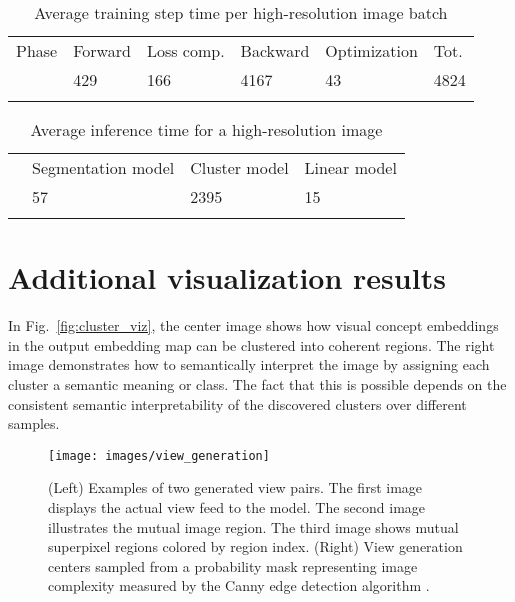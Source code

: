 \documentclass{bmvc2k}
\begin{document}
\setlength{\tabcolsep}{4pt}
\begin{table}
\begin{center}
\caption{Average training step time per high-resolution image batch}
\begin{tabular}{llllll}
\hline\noalign{\smallskip}
 Phase & Forward & Loss comp. & Backward & Optimization & Tot. \\
 \noalign{\smallskip}
 \hline
 [msec] & 429 & 166 & 4167 & 43 & 4824 \\ 
 \hline
\label{tab:training_step_timings}
\end{tabular}
\end{center}
\end{table}
\setlength{\tabcolsep}{1.4pt}

\setlength{\tabcolsep}{4pt}
\begin{table}
\begin{center}
\caption{Average inference time for a high-resolution image}
\begin{tabular}{llll}
\hline\noalign{\smallskip}
  & Segmentation model & Cluster model & Linear model \\
 \noalign{\smallskip}
 \hline
 [msec] & 57 & 2395 & 15 \\ 
 \hline
\label{tab:inference_step_timings}
\end{tabular}
\end{center}
\end{table}
\setlength{\tabcolsep}{1.4pt}

\section{Additional visualization results}

In Fig.~\ref{fig:cluster_viz}, the center image shows how visual concept embeddings in the output embedding map can be clustered into coherent regions. The right image demonstrates how to semantically interpret the image by assigning each cluster a semantic meaning or class. The fact that this is possible depends on the consistent semantic interpretability of the discovered clusters over different samples.

\begin{figure}
\begin{center}
\texttt{[image: images/view\_generation]}
\end{center}
   \caption{(Left) Examples of two generated view pairs. The first image displays the actual view feed to the model. The second image illustrates the mutual image region. The third image shows mutual superpixel regions colored by region index. (Right) View generation centers sampled from a probability mask representing image complexity measured by the Canny edge detection algorithm \cite{Canny1986CannyEdge}.}
\label{fig:view_generation}
\end{figure}
\end{document}

